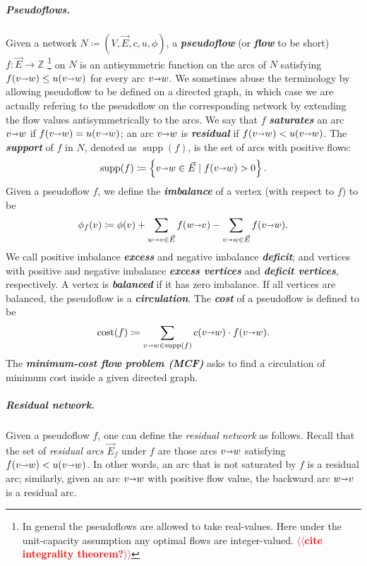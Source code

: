 \documentclass[a4paper,UKenglish]{socg-lipics-v2018}
\makeatletter
\def\note#1{\textcolor{red}{{#1}}}
\def\ints{\mathbb{Z}}
\def\Set#1{\left\{ #1 \right\}}
\def\fsupply{\phi}
\def\arcto{\mathord\shortrightarrow}
\def\arc#1#2{#1\arcto#2}
\def\cost{\operatorname{cost}}
\def\supp{\operatorname{supp}}
\theoremstyle{plain}
\numberwithin{figure}{section}
\renewcommand{\paragraph}{\subparagraph}
\def\EMPH#1{\textbf{\emph{\boldmath #1}}}
\def\n@te#1{\textsf{\boldmath \textbf{$\langle\!\langle$#1$\rangle\!\rangle$}}\leavevmode}
\def\note#1{\textcolor{red}{\n@te{#1}}}
\makeatother
\begin{document}
\paragraph{Pseudoflows.}
Given a network $N \coloneqq (V,\vec{E},c,u,\fsupply)$,
a \EMPH{pseudoflow} (or \EMPH{flow} to be short) $f\colon \vec{E} \to \ints$%
\footnote{In general the pseudoflows are allowed to take real-values.  Here under the unit-capacity assumption any optimal flows are integer-valued. \note{cite integrality theorem?}}
on $N$ is an antisymmetric function on the arcs of $N$ satisfying $f(\arc vw) \leq u(\arc vw)$ for every arc $\arc vw$.%
%
We sometimes abuse the terminology by allowing pseudoflow to be defined on a directed graph, in which case we are actually refering to the pseudoflow on the corresponding network by extending the flow values antisymmetrically to the arcs.
%
We say that $f$ \EMPH{saturates} an arc $\arc vw$ if $f(\arc vw) = u(\arc vw)$; an arc $\arc vw$ is \EMPH{residual} if $f(\arc vw) < u(\arc vw)$.
The \EMPH{support} of $f$ in $N$, denoted as \EMPH{$\supp(f)$}, is the set of arcs with positive flows:
\[
\supp(f) \coloneqq \Set{\arc vw \in \vec{E} \mid f(\arc vw) > 0}.
\]
%
Given a pseudoflow $f$, we define the \EMPH{imbalance} of a vertex (with respect to $f$) to be
\[
\EMPH{$\fsupply_f(v)$} \coloneqq \fsupply(v) + \sum_{\arc wv \in \vec{E}}{f(\arc wv)} - \sum_{\arc vw \in \vec{E}}{f(\arc vw)}.
\]
We call positive imbalance \EMPH{excess} and negative imbalance \EMPH{deficit};
and vertices with positive and negative imbalance \EMPH{excess vertices} and
\EMPH{deficit vertices}, respectively.
A vertex is \EMPH{balanced} if it has zero imbalance.
If all vertices are balanced, the pseudoflow is a \EMPH{circulation}.
The \EMPH{cost} of a pseudoflow
is defined to be
\[
 \EMPH{$\cost(f)$} \coloneqq \sum_{\arc vw \in \supp(f)} c(\arc vw) \cdot f(\arc vw).
\]
%
The \EMPH{minimum-cost flow problem (MCF)} asks to find a circulation of minimum cost inside a given directed graph.

\paragraph{Residual network.}
Given a pseudoflow $f$, one can define the \emph{residual network} as follows.
%
Recall that the set of \emph{residual arcs $\vec{E}_f$} under $f$ are those arcs $\arc vw$ satisfying $f(\arc vw) < u(\arc vw)$.  In other words, an arc that is not saturated by $f$ is a residual arc; similarly, given an arc $\arc vw$ with positive flow value, the backward arc $\arc wv$ is a residual arc.
\end{document}
